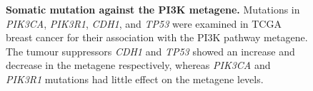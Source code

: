 \begin{figure}[!ht]
\begin{center}
    \end{center}
    \caption[Somatic mutation against the PI3K metagene]{\small \textbf{Somatic mutation against the \gls{PI3K} metagene.} Mutations in \textit{PIK3CA}, \textit{PIK3R1}, \textit{CDH1}, and \textit{TP53} were examined in \gls{TCGA} breast cancer for their association with the \gls{PI3K} \citep{Gatza2011} pathway metagene. The tumour suppressors \textit{CDH1} and \textit{TP53} showed an increase and decrease in the metagene respectively, whereas \textit{PIK3CA} and \textit{PIK3R1} mutations had little effect on the metagene levels.
}
\label{fig:mutation_expr_mg}
\end{figure}

